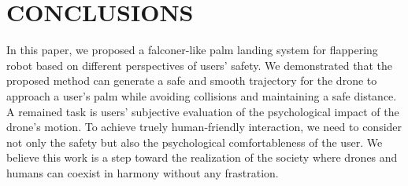 \section{CONCLUSIONS}

In this paper, we proposed a falconer-like palm landing system for flappering robot based on different perspectives of users' safety.
We demonstrated that the proposed method can generate a safe and smooth trajectory for the drone to approach a user's palm while avoiding collisions and maintaining a safe distance.
A remained task is users' subjective evaluation of the psychological impact of the drone's motion.
To achieve truely human-friendly interaction, we need to consider not only the safety but also the psychological comfortableness of the user.
We believe this work is a step toward the realization of the society where drones and humans can coexist in harmony without any frastration.
